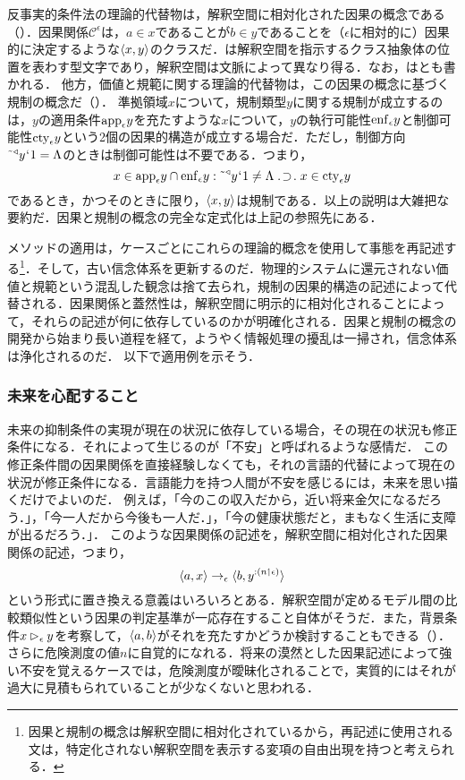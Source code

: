 反事実的条件法の理論的代替物は，解釈空間に相対化された因果の概念である（）．因果関係$\mathcal{C}^\epsilon$は，$ a\in x $であることが$ b\in y $であることを（$\epsilon$に相対的に）因果的に決定するような$\langle x,y \rangle$のクラスだ．\kagi{$ \epsilon $}は解釈空間を指示するクラス抽象体の位置を表わす型文字であり，解釈空間は文脈によって異なり得る．なお，はとも書かれる．
他方，価値と規範に関する理論的代替物は，この因果の概念に基づく規制の概念だ（）．
準拠領域$x$について，規制類型$y$に関する規制が成立するのは，$y$の適用条件$ \mathrm{app}_{\epsilon}y $を充たすような$x$について，$y$の執行可能性$\mathrm{enf}_{\epsilon}y$と制御可能性$\mathrm{cty}_{\epsilon}y$という2個の因果的構造が成立する場合だ．ただし，制御方向$\tilde{\:\:}{^\triangleleft}y{\mspace{1mu}{`}\mspace{1mu}} 1 = \Lambda$のときは制御可能性は不要である．つまり，
\[
    x\in\app{\epsilon}y\cap \enf{\epsilon}y\con{2}\tildel{\trgl{y}}\fap 1 \neq \Lambda\case{1}{1}{1}x\in\cty{\epsilon}y
\]
であるとき，かつそのときに限り，$\langle x,y \rangle$は規制である．以上の説明は大雑把な要約だ．因果と規制の概念の完全な定式化は上記の参照先にある．

メソッドの適用は，ケースごとにこれらの理論的概念を使用して事態を再記述する\footnote{
    因果と規制の概念は解釈空間に相対化されているから，再記述に使用される文は，特定化されない解釈空間を表示する変項の自由出現を持つと考えられる．
}．そして，古い信念体系を更新するのだ．物理的システムに還元されない価値と規範という混乱した観念は捨て去られ，規制の因果的構造の記述によって代替される．因果関係と蓋然性は，解釈空間に明示的に相対化されることによって，それらの記述が何に依存しているのかが明確化される．因果と規制の概念の開発から始まり長い道程を経て，ようやく情報処理の擾乱は一掃され，信念体系は浄化されるのだ．
以下で適用例を示そう．

\subsubsection{未来を心配すること}
\label{sssec:未来を心配する}

未来の抑制条件の実現が現在の状況に依存している場合，その現在の状況も修正条件になる．それによって生じるのが「不安」と呼ばれるような感情だ．
この修正条件間の因果関係を直接経験しなくても，それの言語的代替によって現在の状況が修正条件になる．言語能力を持つ人間が不安を感じるには，未来を思い描くだけでよいのだ．
例えば，「今のこの収入だから，近い将来金欠になるだろう．」，「今一人だから今後も一人だ．」，「今の健康状態だと，まもなく生活に支障が出るだろう．」．
このような因果関係の記述を，解釈空間に相対化された因果関係の記述，つまり，
\[
   \langle a,x \rangle\to_{\epsilon}\langle b,y^{:(n\mathbin{\upharpoonleft}\epsilon)} \rangle
\]
という形式に置き換える意義はいろいろとある．解釈空間が定めるモデル間の比較類似性という因果の判定基準が一応存在すること自体がそうだ．また，背景条件$ x\mathbin{\vartriangleright_{\epsilon}}y $を考察して，$\langle a,b \rangle$がそれを充たすかどうか検討することもできる（）．さらに危険測度の値$n$に自覚的になれる．将来の漠然とした因果記述によって強い不安を覚えるケースでは，危険測度が曖昧化されることで，実質的にはそれが過大に見積もられていることが少なくないと思われる．

